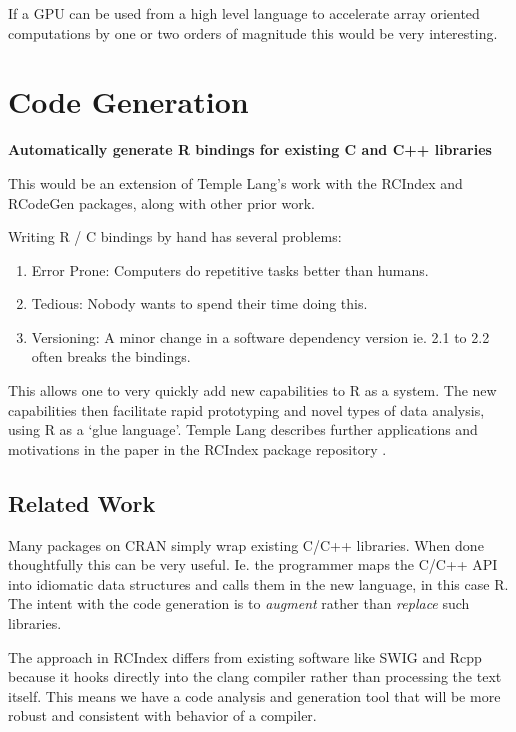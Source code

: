 \documentclass[12pt]{article}
\begin{document}
If a GPU can be used from a high level language to accelerate array
oriented computations by one or two orders of magnitude this would be very
interesting.

\section{Code Generation}

\textbf{Automatically generate R bindings for existing C and C++ libraries}

This would be an extension of Temple Lang's
work with the RCIndex \cite{R-RCIndex} and RCodeGen \cite{R-RCodegen}
packages, along with other prior work.

Writing R / C bindings by hand has several problems: 
\begin{enumerate}
    \item{Error Prone:} Computers do repetitive tasks better than humans.
    \item{Tedious:} Nobody wants to spend their time doing this.
    \item{Versioning:} A minor change in a software dependency version ie. 2.1
        to 2.2 often breaks the bindings.
\end{enumerate}

This allows one to very quickly add new
capabilities to R as a system. The new capabilities then facilitate rapid
prototyping and novel types of data analysis, using R as a `glue language'.
Temple Lang describes further applications and motivations in the paper in
the RCIndex package repository \cite{R-RCIndex}.

\subsection{Related Work}

Many packages on CRAN simply wrap existing C/C++ libraries. When done
thoughtfully this can be very useful. Ie. the programmer maps the C/C++ API
into idiomatic data structures and calls them in the new language, in this
case R.  The intent with the code generation is to \emph{augment} rather
than \emph{replace} such libraries. 

The approach in RCIndex differs from existing software like SWIG
\cite{swig} and Rcpp \cite{R-Rcpp} because it hooks directly into the clang
compiler rather than processing the text itself. This means we have a code
analysis and generation tool that will be more robust and consistent with
behavior of a compiler. 
\end{document}
